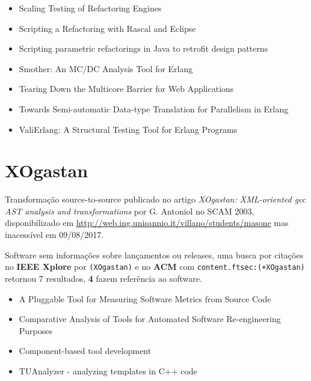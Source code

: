 \begin{itemize}
\item Scaling Testing of Refactoring Engines
\item Scripting a Refactoring with Rascal and Eclipse
\item Scripting parametric refactorings in Java to retrofit design patterns
\item Smother: An MC/DC Analysis Tool for Erlang
\item Tearing Down the Multicore Barrier for Web Applications
\item Towards Semi-automatic Data-type Translation for Parallelism in Erlang
\item ValiErlang: A Structural Testing Tool for Erlang Programs
\end{itemize}

\section{XOgastan}

Transformação source-to-source
publicado no artigo {\it XOgastan: XML-oriented gcc AST analysis and transformations}
por G. Antoniol
no SCAM 2003,
disponibilizado em \url{http://web.ing.unisannio.it/villano/students/masone}
mas inacessível em 09/08/2017.

Software sem informações sobre lançamentos ou releases,
uma busca por citações no {\bf IEEE Xplore} por
\texttt{(XOgastan)}
e no {\bf ACM} com
\texttt{content.ftsec:(+XOgastan)}
retornou
7 resultados,
{\bf 4} fazem referência ao software.

\begin{itemize}
\item A Pluggable Tool for Measuring Software Metrics from Source Code
\item Comparative Analysis of Tools for Automated Software Re-engineering Purposes
\item Component-based tool development
\item TUAnalyzer - analyzing templates in C++ code
\end{itemize}


